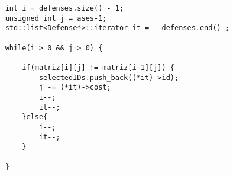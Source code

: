 \begin{lstlisting}
	int i = defenses.size() - 1;
	unsigned int j = ases-1;
    std::list<Defense*>::iterator it = --defenses.end() ;
   
    while(i > 0 && j > 0) {

        if(matriz[i][j] != matriz[i-1][j]) {
            selectedIDs.push_back((*it)->id);
            j -= (*it)->cost;
            i--;
            it--; 
        }else{
            i--;
            it--;
        }
      
    }    
\end{lstlisting}
